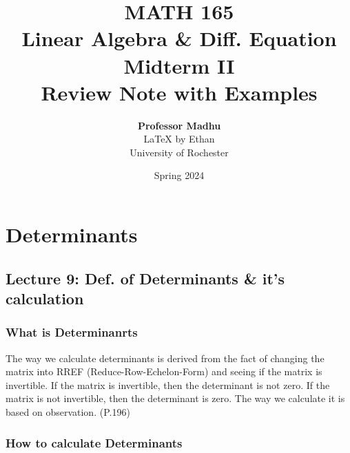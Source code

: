 \documentclass[oneside]{book}
\def\notetitle{MATH 165\\Linear Algebra \& Diff. Equation\\Midterm II \\Review Note with Examples}
\def\noteauthor{
    \textbf{Professor Madhu} \\ 
    {\LaTeX} by Ethan\\
    University of Rochester}
\def\notedate{Spring 2024}
\begin{document}
\title{\textbf{
    \LARGE{\notetitle} \vspace*{10\baselineskip}}
    }
\author{\noteauthor}
\date{\notedate}

\maketitle
\newpage

\tableofcontents
\newpage

\chapter{Determinants}
\section{Lecture 9: Def. of Determinants \& it's calculation}


\subsection{What is Determinanrts}

The way we calculate determinants is derived from the fact of changing the matrix into RREF (Reduce-Row-Echelon-Form) and seeing if the matrix is invertible. If the matrix is invertible, then the determinant is not zero. If the matrix is not invertible, then the determinant is zero. The way we calculate it is based on observation. (P.196)

\subsection{How to calculate Determinants}
\end{document}
